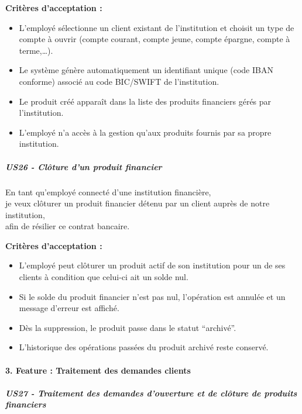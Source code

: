 \textbf{Critères d'acceptation :}

\begin{itemize}
\tightlist
\item
  L'employé sélectionne un client existant de l'institution et choisit
  un type de compte à ouvrir (compte courant, compte jeune, compte
  épargne, compte à terme,\ldots).
\item
  Le système génère automatiquement un identifiant unique (code IBAN
  conforme) associé au code BIC/SWIFT de l'institution.
\item
  Le produit créé apparaît dans la liste des produits financiers gérés
  par l'institution.
\item
  L'employé n'a accès à la gestion qu'aux produits fournis par sa propre
  institution.
\end{itemize}

\hypertarget{us26---cluxf4ture-dun-produit-financier}{%
\subparagraph{US26 - Clôture d'un produit
financier}\label{us26---cluxf4ture-dun-produit-financier}}

En tant qu'employé connecté d'une institution financière,\\
je veux clôturer un produit financier détenu par un client auprès de
notre institution,\\
afin de résilier ce contrat bancaire.

\textbf{Critères d'acceptation :}

\begin{itemize}
\tightlist
\item
  L'employé peut clôturer un produit actif de son institution pour un de
  ses clients à condition que celui-ci ait un solde nul.
\item
  Si le solde du produit financier n'est pas nul, l'opération est
  annulée et un message d'erreur est affiché.
\item
  Dès la suppression, le produit passe dans le statut ``archivé''.
\item
  L'historique des opérations passées du produit archivé reste conservé.
\end{itemize}

\hypertarget{feature-traitement-des-demandes-clients}{%
\paragraph{3. Feature : Traitement des demandes
clients}\label{feature-traitement-des-demandes-clients}}

\hypertarget{us27---traitement-des-demandes-douverture-et-de-cluxf4ture-de-produits-financiers}{%
\subparagraph{US27 - Traitement des demandes d'ouverture et de clôture
de produits
financiers}\label{us27---traitement-des-demandes-douverture-et-de-cluxf4ture-de-produits-financiers}}

